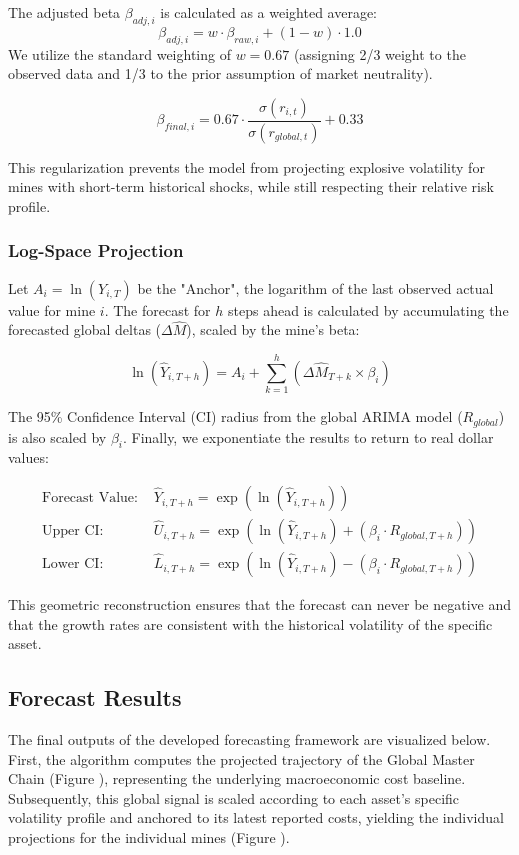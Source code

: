The adjusted beta $\beta_{adj,i}$ is calculated as a weighted average:
\[
\beta_{adj,i} = w \cdot \beta_{raw,i} + (1 - w) \cdot 1.0
\]
We utilize the standard weighting of $w = 0.67$ (assigning 2/3 weight to the observed data and 1/3 to the prior assumption of market neutrality).

\[
\beta_{final,i} = 0.67 \cdot \frac{\sigma(r_{i,t})}{\sigma(r_{global,t})} + 0.33
\]

This regularization prevents the model from projecting explosive volatility for mines with short-term historical shocks, while still respecting their relative risk profile.
\subsubsection{Log-Space Projection}
Let $A_{i} = \ln(Y_{i, T})$ be the "Anchor", the logarithm of the last observed actual value for mine $i$. The forecast for $h$ steps ahead is calculated by accumulating the forecasted global deltas ($\Delta \hat{M}$), scaled by the mine's beta:

\[
\ln(\hat{Y}_{i, T+h}) = A_{i} + \sum_{k=1}^{h} (\Delta \hat{M}_{T+k} \times \beta_i)
\]

The 95\% Confidence Interval (CI) radius from the global ARIMA model ($R_{global}$) is also scaled by $\beta_i$. Finally, we exponentiate the results to return to real dollar values:

\begin{align*}
    \text{Forecast Value: } & \hat{Y}_{i, T+h} = \exp\left( \ln(\hat{Y}_{i, T+h}) \right) \\
    \text{Upper CI: } & \hat{U}_{i, T+h} = \exp\left( \ln(\hat{Y}_{i, T+h}) + (\beta_i \cdot R_{global, T+h}) \right) \\
    \text{Lower CI: } & \hat{L}_{i, T+h} = \exp\left( \ln(\hat{Y}_{i, T+h}) - (\beta_i \cdot R_{global, T+h}) \right)
\end{align*}

This geometric reconstruction ensures that the forecast can never be negative and that the growth rates are consistent with the historical volatility of the specific asset.
\subsection{Forecast Results}

The final outputs of the developed forecasting framework are visualized below. First, the algorithm computes the projected trajectory of the Global Master Chain (Figure ), representing the underlying macroeconomic cost baseline. Subsequently, this global signal is scaled according to each asset's specific volatility profile and anchored to its latest reported costs, yielding the individual projections for the individual mines (Figure ).


